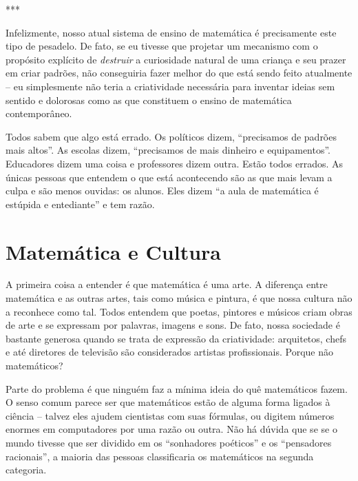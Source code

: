 \documentclass[a4paper,oneside,12pt,notitlepage]{article}
\begin{document}
\vspace{1em}

\begin{center}
***
\end{center}

\vspace{1em}

Infelizmente, nosso atual sistema de ensino de matemática é precisamente este tipo de pesadelo.
De fato, se eu tivesse que projetar um mecanismo com o propósito explícito de \textsl{destruir} a curiosidade natural de uma criança e seu prazer em criar padrões, não conseguiria fazer melhor do que está sendo feito atualmente -- eu simplesmente não teria a criatividade necessária para inventar ideias sem sentido e dolorosas como as que constituem o ensino de matemática contemporâneo.

Todos sabem que algo está errado.
Os políticos dizem, ``precisamos de padrões mais altos''.
As escolas dizem, ``precisamos de mais dinheiro e equipamentos''.
Educadores dizem uma coisa e professores dizem outra.
Estão todos errados.
As únicas pessoas que entendem o que está acontecendo são as que mais levam a culpa e são menos ouvidas: os alunos.
Eles dizem ``a aula de matemática é estúpida e entediante'' e tem razão.

\section*{Matemática e Cultura}

A primeira coisa a entender é que matemática é uma arte.
A diferença entre matemática e as outras artes, tais como música e pintura, é que nossa cultura não a reconhece como tal.
Todos entendem que poetas, pintores e músicos criam obras de arte e se expressam por palavras, imagens e sons.
De fato, nossa sociedade é bastante generosa quando se trata de expressão da criatividade: arquitetos, chefs e até diretores de televisão são considerados artistas profissionais. %
Porque não matemáticos?

Parte do problema é que ninguém faz a mínima ideia do quê matemáticos fazem.
O senso comum parece ser que matemáticos estão de alguma forma ligados à ciência -- talvez eles ajudem cientistas com suas fórmulas, ou digitem números enormes em computadores por uma razão ou outra.
Não há dúvida que se se o mundo tivesse que ser dividido em os ``sonhadores poéticos'' e os ``pensadores racionais'', a maioria das pessoas classificaria os matemáticos na segunda categoria.
\end{document}
